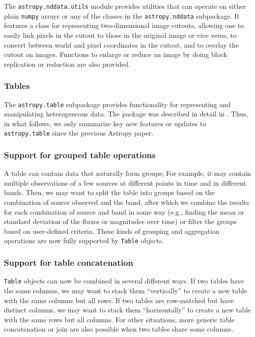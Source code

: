 \documentclass[modern]{aastex61}
\newcommand{\package}[1]{\texttt{#1}\xspace}
\newcommand{\astropy}{Astropy\xspace}
\newcommand{\inlinecomment}[2]{\todo[inline]{#1: #2}\xspace}
\begin{document}
The \package{astropy.nddata.utils} module provides utilities that can operate
on either plain \package{numpy} arrays or any of the classes in the
\package{astropy.nddata} subpackage. It features a class for representing
two-dimensional image cutouts, allowing one to easily link pixels in the cutout
to those in the original image or vice versa, to convert
between world and pixel coordinates in the cutout, and to overlay the cutout
on images. Functions to enlarge or reduce an image by doing block replication
or reduction are also provided.

\subsubsection{Tables}
\label{sec:table}

The \package{astropy.table} subpackage provides functionality for representing
and manipulating heterogeneous data.
The package was described in detail in \cite{astropy}.
Thus, in what follows, we only summarize key new features or updates to
\package{astropy.table} since the previous \astropy paper.


\subsubsection{Support for grouped table operations}

A table can contain data that naturally form groups; For example, it may
contain multiple observations of a few sources at different points in time
and in different bands. Then, we may want to split the table into groups based
on the combination of source observed and the band, after which we combine the
results for each combination of source and band in some way (e.g., finding
the mean or standard deviation of the fluxes or magnitudes over time) or filter
the groups based on user-defined criteria. These kinds of grouping and
aggregation operations are now fully supported by \texttt{Table} objects.

\subsubsection{Support for table concatenation}

\texttt{Table} objects can now be combined in several different ways. If two
tables have the same columns, we may want to stack them ``vertically'' to create a
new table with the same columns but all rows. If two tables are row-matched but
have distinct columns, we may want to stack them ``horizontally'' to create a
new table with the same rows but all columns. For other situations, more generic
table concatenation or join are also possible when two tables share some
columns.
\end{document}
